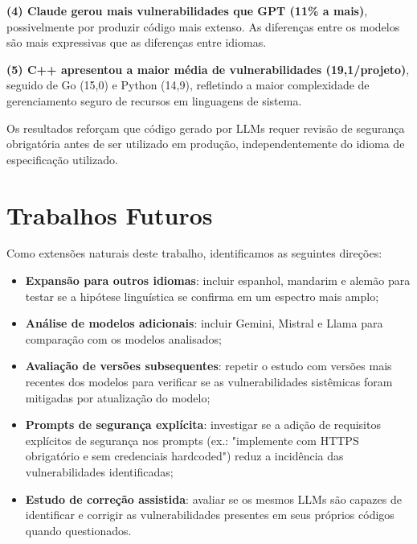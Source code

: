 \documentclass[12pt]{article}
\begin{document}
\textbf{(4) Claude gerou mais vulnerabilidades que GPT (11\% a mais)}, possivelmente por produzir código mais extenso. As diferenças entre os modelos são mais expressivas que as diferenças entre idiomas.

\textbf{(5) C++ apresentou a maior média de vulnerabilidades (19,1/projeto)}, seguido de Go (15,0) e Python (14,9), refletindo a maior complexidade de gerenciamento seguro de recursos em linguagens de sistema.

Os resultados reforçam que código gerado por LLMs requer revisão de segurança obrigatória antes de ser utilizado em produção, independentemente do idioma de especificação utilizado.

\section{Trabalhos Futuros}
\label{sec:futuros}

Como extensões naturais deste trabalho, identificamos as seguintes direções:

\begin{itemize}
  \item \textbf{Expansão para outros idiomas}: incluir espanhol, mandarim e alemão para testar se a hipótese linguística se confirma em um espectro mais amplo;
  \item \textbf{Análise de modelos adicionais}: incluir Gemini, Mistral e Llama para comparação com os modelos analisados;
  \item \textbf{Avaliação de versões subsequentes}: repetir o estudo com versões mais recentes dos modelos para verificar se as vulnerabilidades sistêmicas foram mitigadas por atualização do modelo;
  \item \textbf{Prompts de segurança explícita}: investigar se a adição de requisitos explícitos de segurança nos prompts (ex.: "implemente com HTTPS obrigatório e sem credenciais hardcoded") reduz a incidência das vulnerabilidades identificadas;
  \item \textbf{Estudo de correção assistida}: avaliar se os mesmos LLMs são capazes de identificar e corrigir as vulnerabilidades presentes em seus próprios códigos quando questionados.
\end{itemize}



\end{document}
